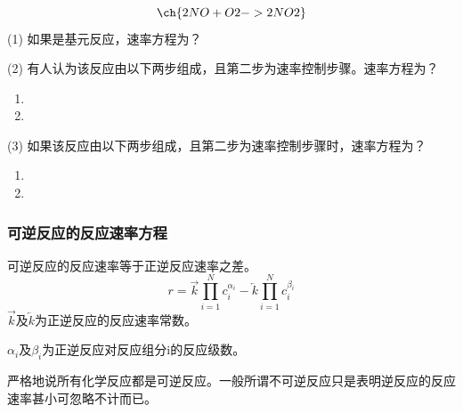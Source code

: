 \begin{frame}[t]
    \frametitle{}
    \begin{example}
        \[
            \ch{2 NO + O2 -> 2 NO2}
        \]
        (1) 如果是基元反应，速率方程为？

        (2) 有人认为该反应由以下两步组成，且第二步为速率控制步骤。速率方程为？
        \begin{enumerate}
          \item {}
          \item {}
        \end{enumerate}
        (3) 如果该反应由以下两步组成，且第二步为速率控制步骤时，速率方程为？
        \begin{enumerate}
            \item {}
            \item {}
          \end{enumerate}
    \end{example}
\end{frame}


\begin{frame}
    \frametitle{可逆反应的反应速率方程}
    可逆反应的反应速率等于正逆反应速率之差。
    \[
        r=\overrightarrow{k}\prod_{i=1}^Nc_i^{\alpha_i}-\overleftarrow{k}\prod_{i=1}^Nc_i^{\beta_i}
    \]
    $\overrightarrow{k}$及$\overleftarrow{k}$为正逆反应的反应速率常数。

    $\alpha_i$及$\beta_i$为正逆反应对反应组分i的反应级数。

    严格地说所有化学反应都是可逆反应。一般所谓不可逆反应只是表明逆反应的反应速率甚小可忽略不计而已。
\end{frame}



